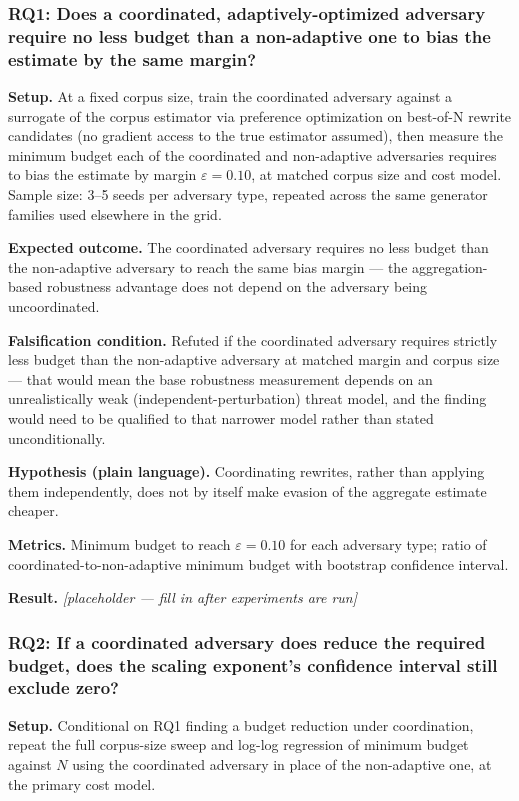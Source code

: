 \documentclass[11pt]{article}
\newcommand{\ph}{\textit{[placeholder --- fill in after experiments are run]}}
\begin{document}
\subsubsection{RQ1: Does a coordinated, adaptively-optimized adversary require no less budget than a non-adaptive one to bias the estimate by the same margin?}
\textbf{Setup.} At a fixed corpus size, train the coordinated adversary against a surrogate of the corpus estimator via preference optimization on best-of-N rewrite candidates (no gradient access to the true estimator assumed), then measure the minimum budget each of the coordinated and non-adaptive adversaries requires to bias the estimate by margin $\varepsilon = 0.10$, at matched corpus size and cost model. Sample size: 3--5 seeds per adversary type, repeated across the same generator families used elsewhere in the grid.

\textbf{Expected outcome.} The coordinated adversary requires no less budget than the non-adaptive adversary to reach the same bias margin --- the aggregation-based robustness advantage does not depend on the adversary being uncoordinated.

\textbf{Falsification condition.} Refuted if the coordinated adversary requires strictly less budget than the non-adaptive adversary at matched margin and corpus size --- that would mean the base robustness measurement depends on an unrealistically weak (independent-perturbation) threat model, and the finding would need to be qualified to that narrower model rather than stated unconditionally.

\textbf{Hypothesis (plain language).} Coordinating rewrites, rather than applying them independently, does not by itself make evasion of the aggregate estimate cheaper.

\textbf{Metrics.} Minimum budget to reach $\varepsilon = 0.10$ for each adversary type; ratio of coordinated-to-non-adaptive minimum budget with bootstrap confidence interval.

\textbf{Result.} \ph

\subsubsection{RQ2: If a coordinated adversary does reduce the required budget, does the scaling exponent's confidence interval still exclude zero?}
\textbf{Setup.} Conditional on RQ1 finding a budget reduction under coordination, repeat the full corpus-size sweep and log-log regression of minimum budget against $N$ using the coordinated adversary in place of the non-adaptive one, at the primary cost model.
\end{document}
